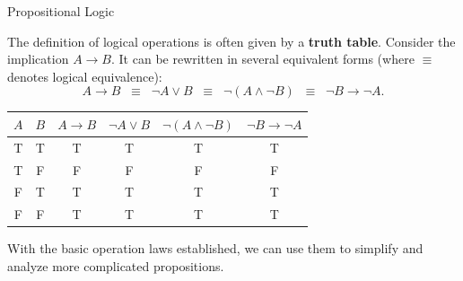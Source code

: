 \documentclass[dvipsnames]{beamer}
\theoremstyle{plain}
\theoremstyle{definition}
\begin{document}
\begin{frame}{Propositional Logic}

The definition of logical operations is often given by a \textbf{truth table}.  Consider the implication $A \to B$.  
It can be rewritten in several equivalent forms (where $\equiv$ denotes logical equivalence):
\[
A \to B \;\;\equiv\;\; \lnot A \lor B 
\;\;\equiv\;\; \lnot(A \land \lnot B) 
\;\;\equiv\;\; \lnot B \to \lnot A.
\]

\begin{table}[htbp]
\centering
\renewcommand{\arraystretch}{1.3}
\begin{tabular}{c c | c c c c}
\hline
$A$ & $B$ & $A \to B$ & $\lnot A \lor B$ & $\lnot(A \land \lnot B)$ & $\lnot B \to \lnot A$ \\
\hline
T & T & T & T & T & T \\
T & F & F & F & F & F \\
F & T & T & T & T & T \\
F & F & T & T & T & T \\
\hline
\end{tabular}
\end{table}
With the basic operation laws established, we can use them to simplify and analyze more complicated propositions.
\end{frame}
\end{document}
